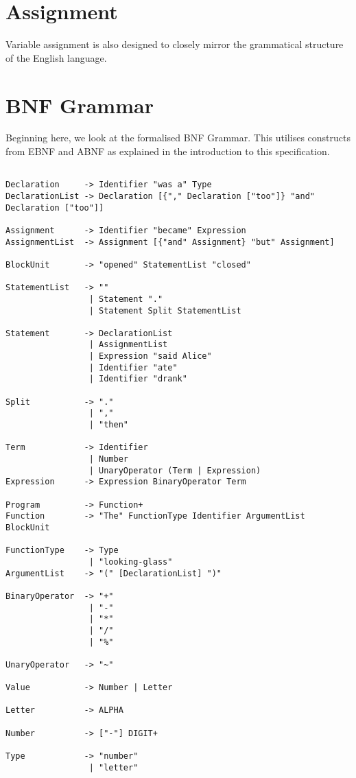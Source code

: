 \documentclass[a4wide, 11pt]{article}
\begin{document}
\section{Assignment}

Variable assignment is also designed to closely mirror the grammatical structure of the English language.

\section{BNF Grammar} 

Beginning here, we look at the formalised BNF Grammar. This utilises constructs from EBNF and ABNF as explained in the introduction to this specification.

\begin{verbatim}

Declaration     -> Identifier "was a" Type
DeclarationList -> Declaration [{"," Declaration ["too"]} "and" Declaration ["too"]]

Assignment      -> Identifier "became" Expression
AssignmentList  -> Assignment [{"and" Assignment} "but" Assignment]

BlockUnit       -> "opened" StatementList "closed"

StatementList   -> ""
                 | Statement "."
                 | Statement Split StatementList
               
Statement       -> DeclarationList
                 | AssignmentList
                 | Expression "said Alice"
                 | Identifier "ate"
                 | Identifier "drank"

Split           -> "."
                 | ","
                 | "then"

Term            -> Identifier
                 | Number
                 | UnaryOperator (Term | Expression)
Expression      -> Expression BinaryOperator Term

Program         -> Function+
Function        -> "The" FunctionType Identifier ArgumentList BlockUnit

FunctionType    -> Type
                 | "looking-glass"
ArgumentList    -> "(" [DeclarationList] ")"

BinaryOperator  -> "+"
                 | "-"
                 | "*"
                 | "/" 
                 | "%"

UnaryOperator   -> "~" 

Value           -> Number | Letter

Letter          -> ALPHA

Number          -> ["-"] DIGIT+

Type            -> "number"
                 | "letter"

\end{verbatim}
\end{document}
